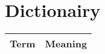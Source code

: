 \onecolumn
\section*{Dictionairy}
\begin{table}[ht]
  \raggedright
  \begin{threeparttable}
    \begin{tabular}{p{4cm}|p{11.5cm}}
      \toprule
      \textbf{Term}   & \textbf{Meaning} \\
      \hline
      \bottomrule
    \end{tabular}
  \end{threeparttable}
\end{table}
\twocolumn
